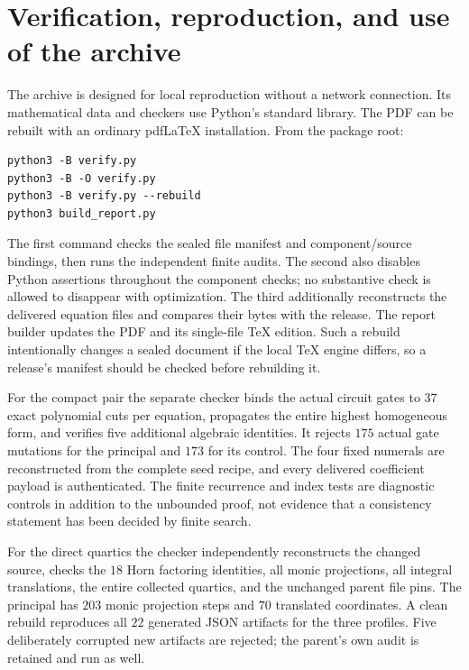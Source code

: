\documentclass[11pt,letterpaper]{article}
\theoremstyle{definition}
\theoremstyle{remark}
\begin{document}




\section{Verification, reproduction, and use of the archive}
\label{sec:verification}

The archive is designed for local reproduction without a network connection.
Its mathematical data and checkers use Python's standard library.  The PDF
can be rebuilt with an ordinary pdfLaTeX installation.  From the package root:
\begin{verbatim}
python3 -B verify.py
python3 -B -O verify.py
python3 -B verify.py --rebuild
python3 build_report.py
\end{verbatim}
The first command checks the sealed file manifest and component/source
bindings, then runs the independent finite audits.  The second also disables
Python assertions throughout the component checks; no substantive check is
allowed to disappear with optimization.  The third additionally reconstructs
the delivered equation files and compares their bytes with the release.
The report builder updates the PDF and its single-file TeX edition.  Such a
rebuild intentionally changes a sealed document if the local TeX engine
differs, so a release's manifest should be checked before rebuilding it.

For the compact pair the separate checker binds the actual circuit gates
to $37$ exact polynomial cuts per equation, propagates the entire highest
homogeneous form, and verifies five additional algebraic identities.
It rejects $175$ actual gate mutations for the principal and $173$ for its
control.  The four fixed numerals are reconstructed from the complete seed
recipe, and every delivered coefficient payload is authenticated.  The
finite recurrence and index tests are diagnostic controls in addition to
the unbounded proof, not evidence that a consistency statement has been
decided by finite search.

For the direct quartics the checker independently reconstructs the changed
source, checks the $18$ Horn factoring identities, all monic projections,
all integral translations, the entire collected quartics, and the unchanged
parent file pins.  The principal has $203$ monic projection steps and $70$
translated coordinates.  A clean rebuild reproduces all $22$ generated
JSON artifacts for the three profiles.  Five deliberately corrupted new
artifacts are rejected; the parent's own audit is retained and run as well.
\end{document}
